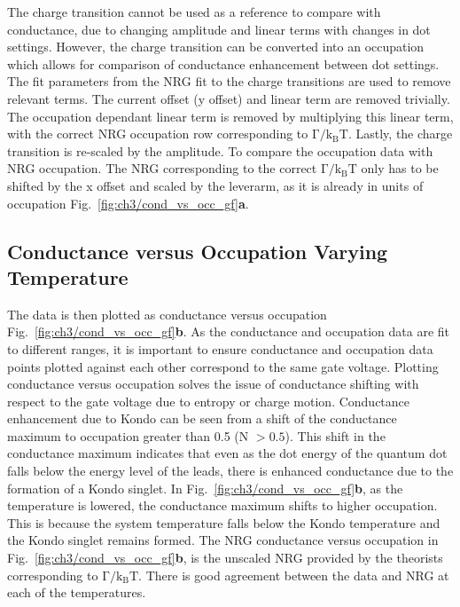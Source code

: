 The charge transition cannot be used as a reference to compare with conductance, due to changing amplitude and linear terms with changes in dot settings. However, the charge transition can be converted into an occupation which allows for comparison of conductance enhancement between dot settings. The fit parameters from the NRG fit to the charge transitions are used to remove relevant terms. The current offset (y offset) and linear term are removed trivially. The occupation dependant linear term is removed by multiplying this linear term, with the correct NRG occupation row corresponding to $\mathrm{\Gamma/k_BT}$. Lastly, the charge transition is re-scaled by the amplitude. To compare the occupation data with NRG occupation. The NRG corresponding to the correct $\mathrm{\Gamma/k_BT}$ only has to be shifted by the x offset and scaled by the leverarm, as it is already in units of occupation Fig.~\ref{fig:ch3/cond_vs_occ_gf}\textbf{a}.


\subsection{Conductance versus Occupation Varying Temperature}
The data is then plotted as conductance versus occupation Fig.~\ref{fig:ch3/cond_vs_occ_gf}\textbf{b}. As the conductance and occupation data are fit to different ranges, it is important to ensure conductance and occupation data points plotted against each other correspond to the same gate voltage. Plotting conductance versus occupation solves the issue of conductance shifting with respect to the gate voltage due to entropy or charge motion. Conductance enhancement due to Kondo can be seen from a shift of the conductance maximum to occupation greater than 0.5 (N $>0.5$). This shift in the conductance maximum indicates that even as the dot energy of the quantum dot falls below the energy level of the leads, there is enhanced conductance due to the formation of a Kondo singlet. In Fig.~\ref{fig:ch3/cond_vs_occ_gf}\textbf{b}, as the temperature is lowered, the conductance maximum shifts to higher occupation. This is because the system temperature falls below the Kondo temperature and the Kondo singlet remains formed. The NRG conductance versus occupation in Fig.~\ref{fig:ch3/cond_vs_occ_gf}\textbf{b}, is the unscaled NRG provided by the theorists corresponding to $\mathrm{\Gamma/k_BT}$. There is good agreement between the data and NRG at each of the temperatures. 

